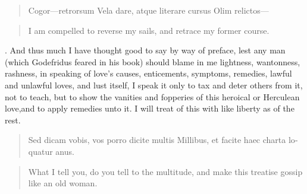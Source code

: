 {\begin{latin}
\begin{verse}%
Cogor---retrorsum
Vela dare, atque literare cursus
Olim relictos---
\end{verse}%
\end{latin}
\translationrule%
\begin{verse}%
I am compelled to reverse my sails,
and retrace my former course.
\end{verse}%

.
And thus much I have thought good to say by way of preface, lest any
man (which Godefridus feared in his book) should blame in me
lightness, wantonness, rashness, in speaking of love's causes,
enticements, symptoms, remedies, lawful and unlawful loves, and lust
itself, I speak it only to tax and deter others from it, not to
teach, but to show the vanities and fopperies of this heroical or
Herculean love,and to apply remedies unto it. I will treat of
this with like liberty as of the rest.

\begin{latin}
\begin{verse}%
Sed dicam vobis, vos porro dicite multis
Millibus, et facite haec charta loquatur anus.
\end{verse}%
\end{latin}
\translationrule%
\begin{verse}%
What I tell you, do you tell to the multitude,
and make this treatise gossip like an old woman.
\end{verse}%

}
